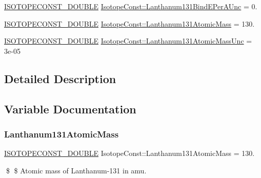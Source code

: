 \begin{DoxyCompactItemize}
\mbox{\hyperlink{group___isotope_const-_macros_ga8f45a7272ce02c0b4c65c44636ed719a}{I\+S\+O\+T\+O\+P\+E\+C\+O\+N\+S\+T\+\_\+\+D\+O\+U\+B\+LE}} \mbox{\hyperlink{group___isotope_const-_lanthanum-_la131_ga14048046dab963fdaba69d4e0df351bd}{Isotope\+Const\+::\+Lanthanum131\+Bind\+E\+Per\+A\+Unc}} = 0.
\item 
\mbox{\hyperlink{group___isotope_const-_macros_ga8f45a7272ce02c0b4c65c44636ed719a}{I\+S\+O\+T\+O\+P\+E\+C\+O\+N\+S\+T\+\_\+\+D\+O\+U\+B\+LE}} \mbox{\hyperlink{group___isotope_const-_lanthanum-_la131_gac894d8c93f66179f4de197d8a34c4959}{Isotope\+Const\+::\+Lanthanum131\+Atomic\+Mass}} = 130.
\item 
\mbox{\hyperlink{group___isotope_const-_macros_ga8f45a7272ce02c0b4c65c44636ed719a}{I\+S\+O\+T\+O\+P\+E\+C\+O\+N\+S\+T\+\_\+\+D\+O\+U\+B\+LE}} \mbox{\hyperlink{group___isotope_const-_lanthanum-_la131_gaa94e459608e07d87b4d3f91fbd80fed8}{Isotope\+Const\+::\+Lanthanum131\+Atomic\+Mass\+Unc}} = 3e-\/05
\end{DoxyCompactItemize}


\subsection{Detailed Description}


\subsection{Variable Documentation}
\mbox{\label{group___isotope_const-_lanthanum-_la131_gac894d8c93f66179f4de197d8a34c4959}} 
\subsubsection{\texorpdfstring{Lanthanum131\+Atomic\+Mass}{Lanthanum131AtomicMass}}
{\footnotesize\ttfamily \mbox{\hyperlink{group___isotope_const-_macros_ga8f45a7272ce02c0b4c65c44636ed719a}{I\+S\+O\+T\+O\+P\+E\+C\+O\+N\+S\+T\+\_\+\+D\+O\+U\+B\+LE}} Isotope\+Const\+::\+Lanthanum131\+Atomic\+Mass = 130.}

\$ \$ Atomic mass of Lanthanum-\/131 in amu. \mbox{\label{group___isotope_const-_lanthanum-_la131_gaa94e459608e07d87b4d3f91fbd80fed8}} 
